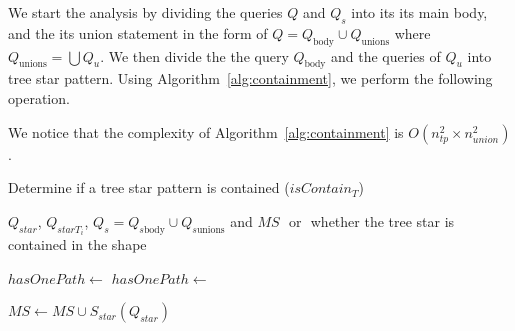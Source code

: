 We start the analysis by dividing the queries $Q$ and $Q_s$ into its its main body, and the its union statement in the form of 
$Q = Q_{\text{body}} \cup Q_{\text{unions}}$ where $Q_{\text{unions}} = \bigcup Q_u$.
We then divide the the query $Q_{\text{body}}$ and the queries of $Q_u$ into tree star pattern.
Using Algorithm~\ref{alg:containment}, we perform the following operation.


We notice that the complexity of Algorithm~\ref{alg:containment} is $O(n_{tp}^2 \times n_{union}^2)$.


\begin{algorithm}
   \caption{Determine if a tree star pattern is contained ($isContain_{T}$)}\label{alg:containmentTree}
   \begin{algorithmic}
      \REQUIRE  $Q_{star}$, $Q_{starT_i}$, $Q_s = Q_{s\text{body}} \cup Q_{s\text{unions}}$ and $MS$
      \ENSURE \TRUE $ $ or \FALSE $ $ whether the tree star is contained in the shape

         \RETURN \TRUE
      \ENDIF 

            \STATE $hasOnePath \gets $ \FALSE
                  \STATE $hasOnePath \gets $ \TRUE
               \ENDIF
            \ENDFOR
               \RETURN \FALSE
            \ENDIF
         \ELSE
                  \RETURN \FALSE
               \ENDIF
            \ENDIF
         \ENDIF
      \ENDFOR

      \STATE $MS \gets MS \cup S_{star}(Q_{star})$
      \RETURN \TRUE
   \end{algorithmic}
\end{algorithm}



